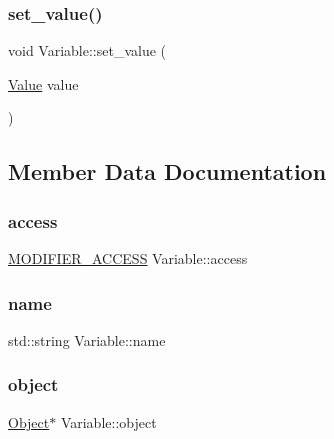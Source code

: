 \mbox{\label{classVariable_af4e546850a78ab022d111a2d1af5b74d}} 
\subsubsection{\texorpdfstring{set\+\_\+value()}{set\_value()}}
{\footnotesize\ttfamily void Variable\+::set\+\_\+value (\begin{DoxyParamCaption}\item[{\hyperlink{classValue}{Value}}]{value }\end{DoxyParamCaption})}



\subsection{Member Data Documentation}
\mbox{\label{classVariable_a20553c67076b2c5a27cc0d35b4cc65b3}} 
\subsubsection{\texorpdfstring{access}{access}}
{\footnotesize\ttfamily \hyperlink{statics_8h_a0cbe4939ec6da73b52afbebd794d60ba}{M\+O\+D\+I\+F\+I\+E\+R\+\_\+\+A\+C\+C\+E\+SS} Variable\+::access}

\mbox{\label{classVariable_aaf7205662069a5f8f673c158cb31f418}} 
\subsubsection{\texorpdfstring{name}{name}}
{\footnotesize\ttfamily std\+::string Variable\+::name}

\mbox{\label{classVariable_aea57391bcc48e74c9d8cae131612ff0b}} 
\subsubsection{\texorpdfstring{object}{object}}
{\footnotesize\ttfamily \hyperlink{classObject}{Object}$\ast$ Variable\+::object}

